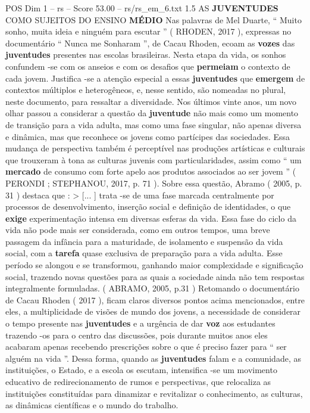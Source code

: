\begin{textsample}{POS Dim 1 – rs – Score 53.00 – rs/rs\_em\_6.txt}  \label{ex:f1_pos_203}
1.5 AS \textbf{JUVENTUDES} COMO SUJEITOS DO ENSINO \textbf{MÉDIO} Nas palavras de Mel Duarte, “ Muito sonho, muita ideia e ninguém para escutar ” ( RHODEN, 2017 ), expressas no documentário “ Nunca me Sonharam ”, de Cacau Rhoden, ecoam as \textbf{vozes} das \textbf{juventudes} presentes nas escolas brasileiras.
Nesta etapa da vida, os sonhos confundem -se com os anseios e com os desafios que \textbf{permeiam} o contexto de cada jovem.
Justifica -se a atenção especial a essas \textbf{juventudes} que \textbf{emergem} de contextos múltiplos e heterogêneos, e, nesse sentido, são nomeadas no plural, neste documento, para ressaltar a diversidade.
Nos últimos vinte anos, um novo olhar passou a considerar a questão da \textbf{juventude} não mais como um momento de transição para a vida adulta, mas como uma fase singular, não apenas diversa e dinâmica, mas que reconhece os jovens como partícipes das sociedades.
Essa mudança de perspectiva também é perceptível nas produções artísticas e culturais que trouxeram à tona as culturas juvenis com particularidades, assim como “ um \textbf{mercado} de consumo com forte apelo aos produtos associados ao ser jovem ” ( PERONDI ; STEPHANOU, 2017, p. 71 ).
Sobre essa questão, Abramo ( 2005, p. 31 ) destaca que : > [... ] trata -se de uma fase marcada centralmente por processos de desenvolvimento, inserção social e definição de identidades, o que \textbf{exige} experimentação intensa em diversas esferas da vida.
Essa fase do ciclo da vida não pode mais ser considerada, como em outros tempos, uma breve passagem da infância para a maturidade, de isolamento e suspensão da vida social, com a \textbf{tarefa} quase exclusiva de preparação para a vida adulta.
Esse período se alongou e se transformou, ganhando maior complexidade e significação social, trazendo novas questões para as quais a sociedade ainda não tem respostas integralmente formuladas. ( ABRAMO, 2005, p.31 ) Retomando o documentário de Cacau Rhoden ( 2017 ), ficam claros diversos pontos acima mencionados, entre eles, a multiplicidade de visões de mundo dos jovens, a necessidade de considerar o tempo presente nas \textbf{juventudes} e a urgência de dar \textbf{voz} aos estudantes trazendo -os para o centro das discussões, pois durante muitos anos eles acabaram apenas recebendo prescrições sobre o que é preciso fazer para “ ser alguém na vida ”.
Dessa forma, quando as \textbf{juventudes} falam e a comunidade, as instituições, o Estado, e a escola os escutam, intensifica -se um movimento educativo de redirecionamento de rumos e perspectivas, que relocaliza as instituições constituídas para dinamizar e revitalizar o conhecimento, as culturas, as dinâmicas científicas e o mundo do trabalho.

\end{textsample}

